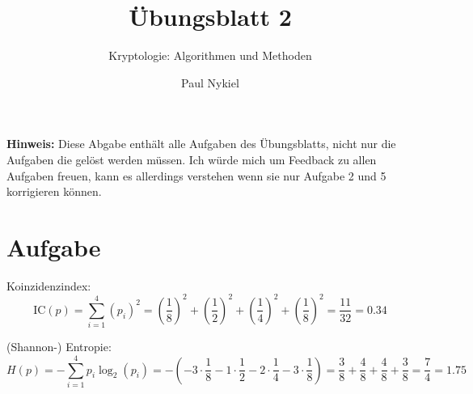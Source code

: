 \documentclass[DIN, pagenumber=false, fontsize=11pt, parskip=half]{scrartcl}
\title{Übungsblatt 2}
\subtitle{Kryptologie: Algorithmen und Methoden}
\author{Paul Nykiel}
\begin{document}
    \maketitle
    \textbf{Hinweis: } Diese Abgabe enthält alle Aufgaben des Übungsblatts, nicht
    nur die Aufgaben die gelöst werden müssen. Ich würde mich um Feedback zu allen
    Aufgaben freuen, kann es allerdings verstehen wenn sie nur Aufgabe 2 und 5 korrigieren
    können.

    \section{Aufgabe}
    Koinzidenzindex:
    \begin{equation}
        \text{IC}(p) = \sum_{i=1}^4 {(p_i)}^2 = {\left(\frac{1}{8}\right)}^2 + {\left(\frac{1}{2}\right)}^2 
            + {\left(\frac{1}{4}\right)}^2 + {\left(\frac{1}{8}\right)}^2 = \frac{11}{32} = 0.34
    \end{equation}

    (Shannon-) Entropie:
    \begin{equation}
        H(p) = - \sum_{i=1}^4 p_i \log_2(p_i) = - \left(-3 \cdot \frac{1}{8}
            - 1 \cdot \frac{1}{2} - 2 \cdot \frac{1}{4} - 3 \cdot \frac{1}{8}\right)
            = \frac{3}{8} + \frac{4}{8} + \frac{4}{8} + \frac{3}{8}
            = \frac{7}{4} = 1.75
    \end{equation}
\end{document}
